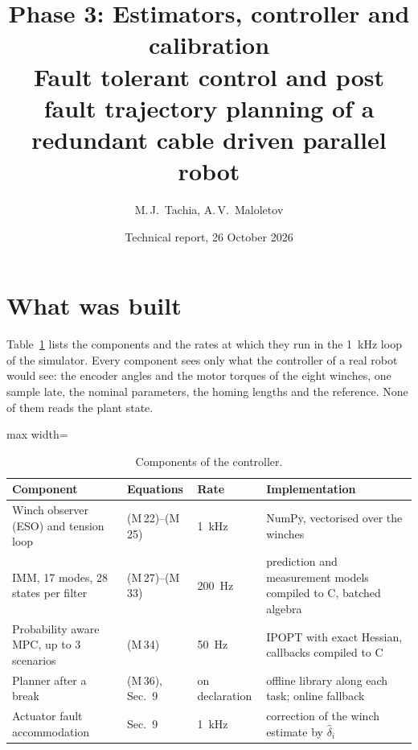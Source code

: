 \documentclass[10pt]{article}
\title{Phase 3: Estimators, controller and calibration\\[2pt]
\large Fault tolerant control and post fault trajectory planning of a redundant cable driven parallel robot}
\author{M.\,J.\ Tachia, A.\,V.\ Maloletov}
\date{Technical report, 26 October 2026}
\begin{document}
\maketitle

\noindent{}

\section{What was built}\label{sec:overview}

Table~\ref{tab:components} lists the components and the rates at which they run in the 1~kHz loop of the simulator. Every component sees only what the controller of a real robot would see: the encoder angles and the motor torques of the eight winches, one sample late, the nominal parameters, the homing lengths and the reference. None of them reads the plant state.

\begin{table}[h]
\centering\small
\caption{Components of the controller.}\label{tab:components}
\begin{adjustbox}{max width=\linewidth}\begin{tabular}{@{}llll@{}}
\toprule
Component & Equations & Rate & Implementation \\
\midrule
Winch observer (ESO) and tension loop & (M\,22)--(M\,25) & 1~kHz & NumPy, vectorised over the winches \\
IMM, 17 modes, 28 states per filter & (M\,27)--(M\,33) & 200~Hz & prediction and measurement models compiled to C, batched algebra \\
Probability aware MPC, up to 3 scenarios & (M\,34) & 50~Hz & IPOPT with exact Hessian, callbacks compiled to C \\
Planner after a break & (M\,36), Sec.~9 & on declaration & offline library along each task; online fallback \\
Actuator fault accommodation & Sec.~9 & 1~kHz & correction of the winch estimate by $\hat\delta_i$ \\
\bottomrule
\end{tabular}\end{adjustbox}
\end{table}
\end{document}
